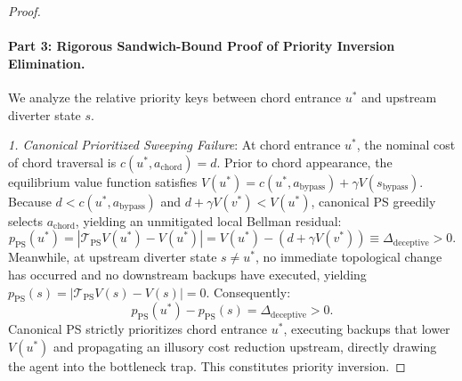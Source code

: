 \documentclass[11pt,a4paper]{article}
\begin{document}
\begin{proof}
\paragraph{Part 3: Rigorous Sandwich-Bound Proof of Priority Inversion Elimination.}
We analyze the relative priority keys between chord entrance $u^*$ and upstream diverter state $s$. 

\textit{1. Canonical Prioritized Sweeping Failure}:
At chord entrance $u^*$, the nominal cost of chord traversal is $c(u^*, a_{\text{chord}}) = d$. Prior to chord appearance, the equilibrium value function satisfies $V(u^*) = c(u^*, a_{\text{bypass}}) + \gamma V(s_{\text{bypass}})$. Because $d < c(u^*, a_{\text{bypass}})$ and $d + \gamma V(v^*) < V(u^*)$, canonical PS greedily selects $a_{\text{chord}}$, yielding an unmitigated local Bellman residual:
\begin{equation}
\label{eq:ps_residual_chord}
p_{\text{PS}}(u^*) = |\mathcal{T}_{\text{PS}} V(u^*) - V(u^*)| = V(u^*) - (d + \gamma V(v^*)) \equiv \Delta_{\text{deceptive}} > 0.
\end{equation}
Meanwhile, at upstream diverter state $s \ne u^*$, no immediate topological change has occurred and no downstream backups have executed, yielding $p_{\text{PS}}(s) = |\mathcal{T}_{\text{PS}} V(s) - V(s)| = 0$. Consequently:
\begin{equation}
p_{\text{PS}}(u^*) - p_{\text{PS}}(s) = \Delta_{\text{deceptive}} > 0.
\end{equation}
Canonical PS strictly prioritizes chord entrance $u^*$, executing backups that lower $V(u^*)$ and propagating an illusory cost reduction upstream, directly drawing the agent into the bottleneck trap. This constitutes priority inversion.


\end{proof}
\end{document}
